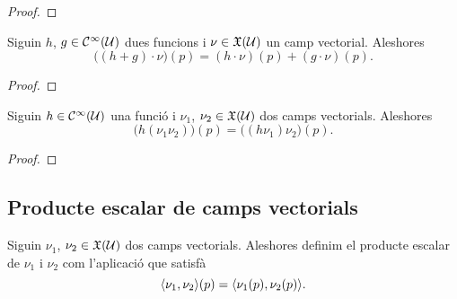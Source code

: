 \documentclass[../Apunts.tex]{subfiles}
\begin{document}
	\begin{proof}
	\end{proof}
	\begin{proposition}
		\label{prop:el producte d'una funcio i un camp vectorial és distributiu per la suma de funcions}
		Siguin \(h\), \(g\in\mathcal{C}^{\infty}(\mathcal{U})\) dues funcions i \(\nu\in\mathfrak{X}(\mathcal{U})\) un camp vectorial. Aleshores
		\[\big((h+g)\cdot\nu\big)(p)=(h\cdot\nu)(p)+(g\cdot\nu)(p).\]
	\end{proposition}
	\begin{proof}
	\end{proof}
	\begin{proposition}
		\label{prop:el producte d'una funció i un camp vectorial és associatiu pel producte de camps vectorials}
		Siguin \(h\in\mathcal{C}^{\infty}(\mathcal{U})\) una funció i \(\nu_{1}\), \(\nu_{2}\in\mathfrak{X}(\mathcal{U})\) dos camps vectorials. Aleshores
		\[\big(h(\nu_{1}\nu_{2})\big)(p)=\big((h\nu_{1})\nu_{2}\big)(p).\]
	\end{proposition}
	\begin{proof}
	\end{proof}
	\subsection{Producte escalar de camps vectorials}
	\begin{definition}
		\label{def:producte escalar de camps vectorials}
		Siguin \(\nu_{1}\), \(\nu_{2}\in\mathfrak{X}(\mathcal{U})\) dos camps vectorials. Aleshores definim el producte escalar de \(\nu_{1}\) i \(\nu_{2}\) com l'aplicació que satisfà
		\[\prodesc{\nu_{1}}{\nu_{2}}(p)=\prodesc{\nu_{1}(p)}{\nu_{2}(p)}.\]
	\end{definition}
\end{document}
